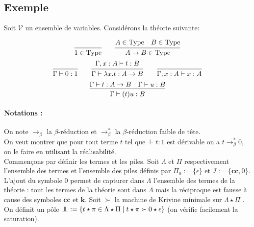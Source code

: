 \documentclass[a4paper,12pt]{article}
\theoremstyle{rmqstyle}
\newcommand{\set}[1]{\{#1\}}
\newcommand{\cc}{\mathbf{cc}}
\renewcommand{\k}{\mathbf{k}}
\newcommand{\type}{\mathrm{Type}}
\newcommand{\rbeta}{\longrightarrow_\beta}
\newcommand{\pole}{{\protect\mathpalette{\protect\polehelper}{\bot}}} \def\polehelper#1#2{\mathrel{\rlap{$#1#2$}\mkern3mu{#1#2}}}
\begin{document}
\subsection{Exemple}

Soit $\mathcal{V}$ un ensemble de variables. Considérons la théorie suivante:

$$
\begin{prooftree}[center=false]
\infer0{1 \in \type}
\end{prooftree}
\qquad
\begin{prooftree}[center=false]
\hypo{A \in \type \quad B \in \type}
\infer1{A \to B \in \type}
\end{prooftree}
$$
\vspace{0.5 em}
$$
\begin{prooftree}[center=false]
\infer0{\Gamma \vdash 0 : 1}
\end{prooftree}
\qquad
\begin{prooftree}[center=false]
\hypo{\Gamma, x : A \vdash t : B}
\infer1{\Gamma \vdash \lambda x.t : A \to B}
\end{prooftree}
\qquad
\begin{prooftree}[center=false]
\infer0{\Gamma, x : A \vdash x : A}
\end{prooftree}
$$
\vspace{0.5 em}
$$
\begin{prooftree}[center=false]
\hypo{\Gamma \vdash t : A \to B \quad \Gamma \vdash u : B}
\infer1{\Gamma \vdash (t)u : B}
\end{prooftree}
$$

\paragraph{Notations :}On note $\rbeta$ la $\beta$-réduction et $\rbeta^*$ la $\beta$-réduction faible de tête.\\

On veut montrer que pour tout terme $t$ tel que $\vdash t : 1$ est dérivable on a $t \rbeta^* 0$, on le faire en utilisant la réalisabilité.\\

Commençons par définir les termes et les piles. Soit $\Lambda$ et $\Pi$ respectivement l'ensemble des termes et l'ensemble des piles définis par $\Pi_0 := \set{\epsilon}$ et $\mathcal{I} := \set{\cc, 0}$. L'ajout du symbole $0$ permet de capturer dans $\Lambda$ l'ensemble des termes de la théorie : tout les termes de la théorie sont dans $\Lambda$ mais la réciproque est fausse à cause des symboles $\cc$ et $\k$. Soit $\succ$ la machine de Krivine minimale sur $\Lambda \star \Pi$ . On définit un pôle $\pole := \set{ t \star \pi \in \Lambda \star \Pi \mid t \star \pi \succ 0 \star \epsilon}$ (on vérifie facilement la saturation).\\
\end{document}
